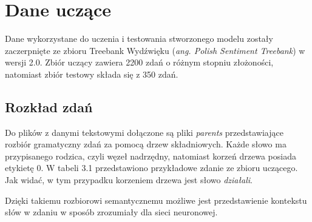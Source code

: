 \chapter{Dane uczące}
\label{cha:dane}

Dane wykorzystane do uczenia i testowania stworzonego modelu zostały zaczerpnięte ze zbioru Treebank Wydźwięku (\textit{ang.  Polish Sentiment Treebank})\cite{treebank} w wersji 2.0. Zbiór uczący zawiera 2200 zdań o różnym stopniu złożoności, natomiast zbiór testowy składa się z 350 zdań. 

\section{Rozkład zdań}
\label{sec:rozklad}

Do plików z danymi tekstowymi dołączone są pliki \textit{parents} przedstawiające rozbiór gramatyczny zdań za pomocą drzew składniowych. Każde słowo ma przypisanego rodzica, czyli węzeł nadrzędny, natomiast korzeń drzewa posiada etykietę 0. W tabeli 3.1 przedstawiono przykładowe zdanie ze zbioru uczącego. Jak widać, w tym przypadku korzeniem drzewa jest słowo \textit{działali}.

\begin{table}[H]
\centering
{}
\caption{Przykładowe zdanie z wykorzystanego zbioru danych wraz z przypisanymi rodzicami.}
\label{table:bf-sa}
\end{table}

Dzięki takiemu rozbiorowi semantycznemu możliwe jest przedstawienie kontekstu słów w zdaniu w sposób zrozumiały dla sieci neuronowej.


